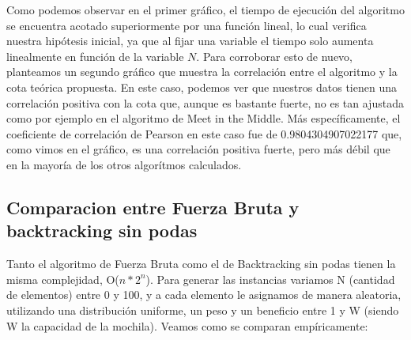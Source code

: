 Como podemos observar en el primer gráfico, el tiempo de ejecución del algoritmo se encuentra acotado superiormente por una función lineal, lo cual verifica nuestra hipótesis inicial, ya que al fijar una variable el tiempo solo aumenta linealmente en función de la variable $N$. Para corroborar esto de nuevo, planteamos un segundo gráfico que muestra la correlación entre el algoritmo y la cota teórica propuesta. En este caso, podemos ver que nuestros datos tienen una correlación positiva con la cota que, aunque es bastante fuerte, no es tan ajustada como por ejemplo en el algoritmo de Meet in the Middle. Más específicamente, el coeficiente de correlación de Pearson en este caso fue de 0.9804304907022177 que, como vimos en el gráfico, es una correlación positiva fuerte, pero más débil que en la mayoría de los otros algorítmos calculados.
\newpage
\subsection{Comparacion entre Fuerza Bruta y backtracking sin podas}
Tanto el algoritmo de Fuerza Bruta como el de Backtracking sin podas tienen la misma complejidad, O($n*2^{n}$). Para generar las instancias variamos N (cantidad de elementos) entre 0 y 100, y a cada elemento le asignamos de manera aleatoria, utilizando una distribución uniforme, un peso y un beneficio entre 1 y W (siendo W la capacidad de la mochila).
Veamos como se comparan empíricamente:

